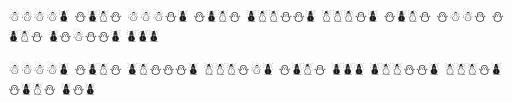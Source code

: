 \documentclass{article}
\begin{document}
\begin{whitesnowman}
☃☃☃☃⛇ %
⛄⛇☃⛄
☃☃☃⛄⛇ %
⛄⛇☃⛄
⛇☃☃⛄⛄⛇ %
☃☃☃⛄⛇ %
⛄⛇☃⛄
⛄☃☃⛄ %
⛄⛇☃⛄
⛇⛄☃⛄⛄⛇ %
⛇⛇⛇ %
\end{whitesnowman}

\begin{whitesnowman}
☃☃☃☃⛇ %
⛄⛇☃⛄
⛇☃⛄⛄⛄⛇ %
☃☃☃⛄☃⛇ %
⛄⛇☃⛄
⛇⛇⛇ %
⛇☃☃⛄⛄⛇ %
☃☃☃⛄⛇ %
⛄⛇☃⛄
⛇⛄⛇ %
\end{whitesnowman}
\end{document}
